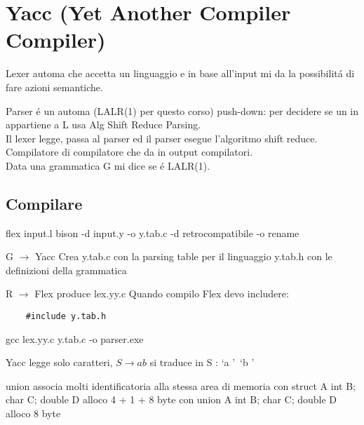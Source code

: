 \chapter{Yacc (Yet Another Compiler Compiler)}

Lexer automa che accetta un linguaggio e in base all'input mi da la possibilit\'a di fare azioni semantiche.

Parser \'e un automa (LALR(1) per questo corso) push-down: per decidere se un in appartiene a L usa Alg Shift Reduce Parsing.\\
	
Il lexer legge, passa al parser ed il parser esegue l'algoritmo shift reduce.\\

Compilatore di compilatore che da in output compilatori.\\

Data una grammatica G mi dice se \'e LALR(1).

\section{Compilare}
flex input.l
bison -d input.y -o y.tab.c
	-d retrocompatibile 
	-o rename

G $\rightarrow$ Yacc Crea
	y.tab.c con la parsing table per il linguaggio
	y.tab.h con le definizioni della grammatica

R $\rightarrow$ Flex produce lex.yy.c
Quando compilo Flex devo includere:

\begin{lstlisting}
	#include y.tab.h
\end{lstlisting}

gcc lex.yy.c y.tab.c -o parser.exe

Yacc legge solo caratteri, $S \rightarrow ab$ si traduce in S : \lq a \rq\ \lq b \rq

union associa molti identificatoria alla stessa area di memoria
con struct A{ int B; char C; double D} alloco 4 + 1 + 8 byte
con union A{ int B; char C; double D} alloco 8 byte

